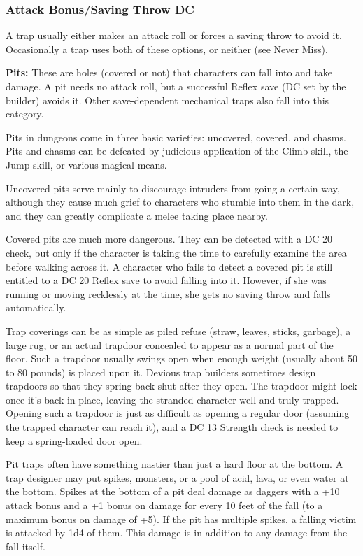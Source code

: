 \subsubsection{Attack Bonus/Saving Throw DC}
A trap usually either makes an attack roll or forces a saving throw to avoid it. Occasionally a trap uses both of these options, or neither (see Never Miss).

\textbf{Pits:} These are holes (covered or not) that characters can fall into and take damage. A pit needs no attack roll, but a successful Reflex save (DC set by the builder) avoids it. Other save-dependent mechanical traps also fall into this category.

Pits in dungeons come in three basic varieties: uncovered, covered, and chasms. Pits and chasms can be defeated by judicious application of the Climb skill, the Jump skill, or various magical means.

Uncovered pits serve mainly to discourage intruders from going a certain way, although they cause much grief to characters who stumble into them in the dark, and they can greatly complicate a melee taking place nearby.

Covered pits are much more dangerous. They can be detected with a DC 20  check, but only if the character is taking the time to carefully examine the area before walking across it. A character who fails to detect a covered pit is still entitled to a DC 20 Reflex save to avoid falling into it. However, if she was running or moving recklessly at the time, she gets no saving throw and falls automatically.

Trap coverings can be as simple as piled refuse (straw, leaves, sticks, garbage), a large rug, or an actual trapdoor concealed to appear as a normal part of the floor. Such a trapdoor usually swings open when enough weight (usually about 50 to 80 pounds) is placed upon it. Devious trap builders sometimes design trapdoors so that they spring back shut after they open. The trapdoor might lock once it's back in place, leaving the stranded character well and truly trapped. Opening such a trapdoor is just as difficult as opening a regular door (assuming the trapped character can reach it), and a DC 13 Strength check is needed to keep a spring-loaded door open.

Pit traps often have something nastier than just a hard floor at the bottom. A trap designer may put spikes, monsters, or a pool of acid, lava, or even water at the bottom. Spikes at the bottom of a pit deal damage as daggers with a +10 attack bonus and a +1 bonus on damage for every 10 feet of the fall (to a maximum bonus on damage of +5). If the pit has multiple spikes, a falling victim is attacked by 1d4 of them. This damage is in addition to any damage from the fall itself.

